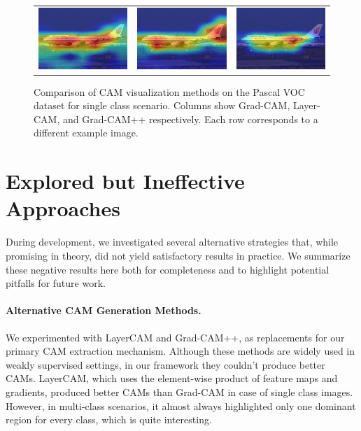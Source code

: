 \begin{figure}[H]
\begin{tabular}{c c c}
    \includegraphics[width=0.18\linewidth, height=0.18\linewidth]{figures/cams/gradcam/2008_003976_0} &
    \includegraphics[width=0.18\linewidth, height=0.18\linewidth]{figures/cams/layercam/2008_003976_0} &
    \includegraphics[width=0.18\linewidth, height=0.18\linewidth]{figures/cams/gradcampp/2008_003976_0} \\

  \end{tabular}

  \caption{Comparison of CAM visualization methods on the Pascal VOC dataset for single class scenario. Columns show Grad-CAM, Layer-CAM, and Grad-CAM++ respectively. Each row corresponds to a different example image.}
  \label{fig:cam_variation_singleclass}
\end{figure}

\section{Explored but Ineffective Approaches}
\label{sec:ineffective_approaches}

During development, we investigated several alternative strategies that, while promising in theory, did not yield satisfactory results in practice. We summarize these negative results here both for completeness and to highlight potential pitfalls for future work.  

\paragraph{Alternative CAM Generation Methods.} 
We experimented with LayerCAM and Grad-CAM++, as replacements for our primary CAM extraction mechanism. Although these methods are widely used in weakly supervised settings, in our framework they couldn't produce better CAMs. 
LayerCAM, which uses the element-wise product of feature maps and gradients, produced better CAMs than Grad-CAM in case of single class images. However, in multi-class scenarios, it almost always highlighted only one dominant region for every class, which is quite interesting.




